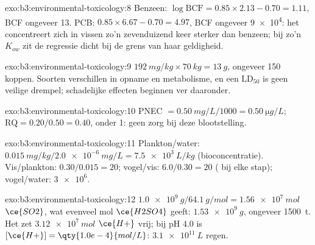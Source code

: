 \begin{solution}{exo:b3:environmental-toxicology:8}
Benzeen: $\log\mathrm{BCF} = 0.85 \times 2.13 - 0.70 = 1.11$, BCF ongeveer 13. PCB: $0.85 \times 6.67 - 0.70 = 4.97$, BCF ongeveer
\num{9e4}: het concentreert zich in vissen zo'n zevenduizend keer sterker
dan benzeen; bij zo'n
$K_{ow}$ zit de regressie dicht bij de grens van haar geldigheid.
\end{solution}

\begin{solution}{exo:b3:environmental-toxicology:9}
$\qty{192}{mg/kg} \times \qty{70}{kg} = \qty{13}{g}$, ongeveer 150 koppen. Soorten verschillen in opname en
metabolisme,
en een $\mathrm{LD_{50}}$ is geen veilige drempel; schadelijke effecten beginnen ver daaronder.
\end{solution}

\begin{solution}{exo:b3:environmental-toxicology:10}
PNEC $= \qty{0.50}{mg/L}/1000 = \qty{0.50}{\micro g/L}$; $\mathrm{RQ} = 0.20/0.50 = 0.40$, onder 1: geen zorg bij deze blootstelling.
\end{solution}

\begin{solution}{exo:b3:environmental-toxicology:11}
Plankton/water: $\qty{0.015}{mg/kg}/\qty{2.0e-6}{mg/L} = \qty{7.5e3}{L/kg}$ (bioconcentratie). Vis/plankton: $0.30/0.015 = 20$;
vogel/vis: $6.0/0.30 = 20$ ( bij elke stap); vogel/water: $\num{3e6}$.
\end{solution}

\begin{solution}{exo:b3:environmental-toxicology:12}
$\qty{1.0e9}{g}/\qty{64.1}{g/mol} = \qty{1.56e7}{mol}$ $\ce{SO2}$, wat evenveel mol $\ce{H2SO4}$ geeft: $\qty{1.53e9}{g}$, ongeveer \qty{1500}{t}. Het
zet $\qty{3.12e7}{mol}$ $\ce{H+}$ vrij; bij pH 4.0 is $[\ce{H+}] = \qty{1.0e-4}{mol/L}$: $\qty{3.1e11}{L}$ regen.
\end{solution}

